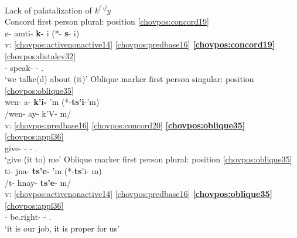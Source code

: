 \documentclass[output=paper]{langscibook}
\begin{document}
\ea\label{bkm:Ref90223831}Lack of palatalization of \textit{k\textsuperscript{(}}\textit{'\textsuperscript{)}}\textit{y}\\
    \ea\label{bkm:Ref90246072} Concord first person plural: position \ref{chovpos:concord19}\\ {
    \glll {} ø{}- amti- \textbf{k-} i  (*- \textbf{s}{}- i)\\ 
    v: \ref{chovpos:activenonactive14} \ref{chovpos:predbase16} \textbf{\ref{chovpos:concord19}} \ref{chovpos:distaley32}\\ 
    {} \First{}- speak- \textbf{\First\Pl{}}- \Ap.\Dist{}\\ 
    \glt `we talke(d) about (it)'
    }
    \ex\label{bkm:Ref90246066}Oblique marker first person singular: position \ref{chovpos:oblique35} \\ {
    \gllll {} wen- a- \textbf{k'i-} 'm    (*-\textbf{ts'i}{}-'m)\\ 
    {} /wen- ay- k'V- m/ \\ 
    v: \ref{chovpos:predbase16} \ref{chovpos:concord20} \textbf{\ref{chovpos:oblique35}} \ref{chovpos:appl36}\\ 
    {} give- \Second\Pl{}- \First\Sg{}- \Ap.\Loc{}\\
    \glt `give (it to) me'
    }
    \ex\label{bkm:Ref90244880}Oblique marker first person plural: position \ref{chovpos:oblique35}\\ {
    \gllll {} ti{}- jna- \textbf{ts'e-} 'm     (*-\textbf{ts}'i- m)\\ 
     {} /t- hnay- \textbf{ts'e}{}- m/\\ 
    v: \ref{chovpos:activenonactive14} \ref{chovpos:predbase16} \textbf{\ref{chovpos:oblique35}} \ref{chovpos:appl36}\\ 
    {} \Third{}- be.right- \textbf{\First\Pl{}}- \Ap.\Loc{}\\
    \glt `it is our job, it is proper for us'
    }
    \z 
\z 
\end{document}
